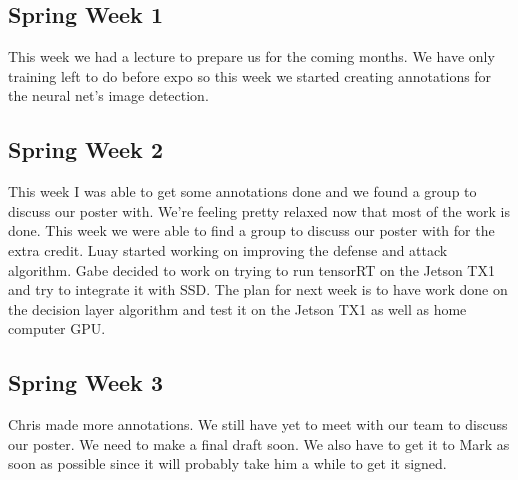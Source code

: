 \documentclass[onecolumn, draftclsnofoot,10pt, compsoc]{IEEEtran}
\begin{document}
\subsection{Spring Week 1}
This week we had a lecture to prepare us for the coming months.
We have only training left to do before expo so this week we started creating annotations for the neural net's image detection.

\subsection{Spring Week 2}
This week I was able to get some annotations done and we found a group to discuss our poster with.
We're feeling pretty relaxed now that most of the work is done.
This week we were able to find a group to discuss our poster with for the extra credit.
Luay started working on improving the defense and attack algorithm.
Gabe decided to work on trying to run tensorRT on the Jetson TX1 and try to integrate it with SSD.
The plan for next week is to have work done on the decision layer algorithm and test it on the Jetson TX1 as well as home computer GPU.

\subsection{Spring Week 3}
Chris made more annotations.
We still have yet to meet with our team to discuss our poster.
We need to make a final draft soon.
We also have to get it to Mark as soon as possible since it will probably take him a while to get it signed.
\end{document}
